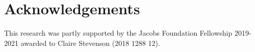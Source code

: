 \section*{Acknowledgements}

This research was partly supported by the Jacobs Foundation
Fellowship 2019-2021 awarded to Claire Stevenson (2018 1288 12).
